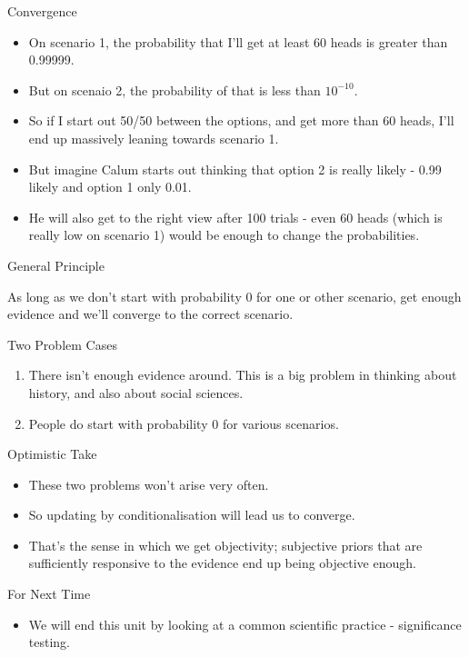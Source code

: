 \documentclass[
  ignorenonframetext,
]{beamer}
\providecommand{\tightlist}{%
  \setlength{\itemsep}{0pt}\setlength{\parskip}{0pt}}
\renewcommand{\,}{\text{, }}
\begin{document}
\begin{frame}{Convergence}
\protect\hypertarget{convergence-1}{}

\begin{itemize}
\tightlist
\item
  On scenario 1, the probability that I'll get at least 60 heads is
  greater than 0.99999.
\item
  But on scenaio 2, the probability of that is less than \(10^{-10}\).
\item
  So if I start out 50/50 between the options, and get more than 60
  heads, I'll end up massively leaning towards scenario 1. \pause
\item
  But imagine Calum starts out thinking that option 2 is really likely -
  0.99 likely and option 1 only 0.01.
\item
  He will also get to the right view after 100 trials - even 60 heads
  (which is really low on scenario 1) would be enough to change the
  probabilities.
\end{itemize}

\end{frame}

\begin{frame}{General Principle}
\protect\hypertarget{general-principle}{}

As long as we don't start with probability 0 for one or other scenario,
get enough evidence and we'll converge to the correct scenario.

\end{frame}

\begin{frame}{Two Problem Cases}
\protect\hypertarget{two-problem-cases}{}

\begin{enumerate}
\tightlist
\item
  There isn't enough evidence around. This is a big problem in thinking
  about history, and also about social sciences.
\item
  People do start with probability 0 for various scenarios.
\end{enumerate}

\end{frame}

\begin{frame}{Optimistic Take}
\protect\hypertarget{optimistic-take}{}

\begin{itemize}
\tightlist
\item
  These two problems won't arise very often.
\item
  So updating by conditionalisation will lead us to converge.
\item
  That's the sense in which we get objectivity; subjective priors that
  are sufficiently responsive to the evidence end up being objective
  enough.
\end{itemize}

\end{frame}

\begin{frame}{For Next Time}
\protect\hypertarget{for-next-time}{}

\begin{itemize}
\tightlist
\item
  We will end this unit by looking at a common scientific practice -
  significance testing.
\end{itemize}

\end{frame}
\end{document}
